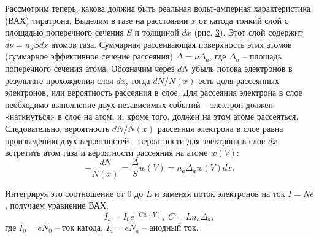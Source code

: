 \documentclass[a4paper,12pt]{article}
\begin{document}
Рассмотрим теперь, какова должна быть реальная вольт-амперная характеристика (ВАХ) тиратрона. Выделим в газе на расстоянии $x$ от катода тонкий слой с площадью поперечного сечения $S$ и толщиной $dx$ (рис. \hyperref[fig: Exp setup]{3}). Этот слой содержит $d\nu = n_a Sdx$ атомов газа. Суммарная рассеивающая поверхность этих атомов (суммарное эффективное сечение рассеяния) $\Delta = \nu\Delta_a$, где $\Delta_a$ -- площадь поперечного сечения атома. Обозначим через $dN$ убыль потока электронов в результате прохождения слоя $dx$, тогда $dN/N(x)$ есть доля рассеянных электронов, или вероятность рассеяния в слое. Для рассеяния электрона в слое необходимо выполнение двух независимых событий -- электрон должен «наткнуться» в слое на
атом, и, кроме того, должен на этом атоме рассеяться. Следовательно, вероятность $dN/N(x)$ рассеяния электрона в слое равна произведению двух вероятностей -- вероятности для электрона в слое $dx$ встретить атом газа и вероятности рассеяния на атоме $w(V)$:
\begin{equation}\label{eq: Scattering probability}
    -\frac{dN}{N(x)} = \frac{\Delta}{S}w(V) = n_a\Delta_a w(V)dx.
\end{equation}

Интегрируя это соотношение от $0$ до $L$ и заменяя поток электронов на ток $I = Ne$, получаем уравнение ВАХ:
\begin{equation}\label{eq: Current-voltage characteristic}
    I_a = I_0e^{-Cw(V)},\; C = L n_a\Delta_a,
\end{equation}
где $I_0 = eN_0$ -- ток катода, $I_a = eN_a$ -- анодный ток.
\end{document}

